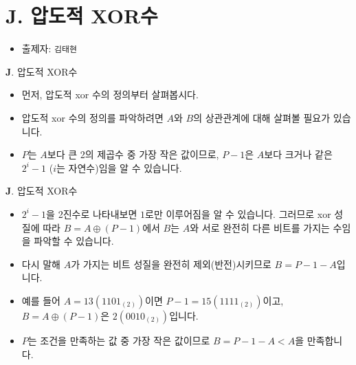 \section{J. 압도적 XOR수}

\begin{frame} %
    \begin{itemize}
        \item 출제자: \texttt{김태현}
    \end{itemize}
\end{frame}

\begin{frame}{\textbf{J}. 압도적 XOR수}
    \begin{itemize}
        \item 먼저, 압도적 xor 수의 정의부터 살펴봅시다.
        \item 압도적 xor 수의 정의를 파악하려면 $A$와 $B$의 상관관계에 대해 살펴볼 필요가 있습니다.
        \item $P$는 $A$보다 큰 2의 제곱수 중 가장 작은 값이므로, $P-1$은 $A$보다 크거나 같은 $2^i-1$ ($i$는 자연수)임을 알 수 있습니다.
    \end{itemize}
\end{frame}

\begin{frame}{\textbf{J}. 압도적 XOR수}
	\begin{itemize}
		\item $2^i-1$을 2진수로 나타내보면 $1$로만 이루어짐을 알 수 있습니다. 그러므로 xor 성질에 따라 $B = A \oplus (P-1)$에서 $B$는 $A$와 서로 완전히 다른 비트를 가지는 수임을 파악할 수 있습니다. 
		\item 다시 말해 $A$가 가지는 비트 성질을 완전히 제외(반전)시키므로 $B = P - 1 - A$입니다.
		\item 예를 들어 $A = 13 (1101_{(2)})$이면 $P-1 = 15 (1111_{(2)})$이고, $B = A \oplus (P-1)$은 $2 (0010_{(2)})$입니다. 
		\item $P$는 조건을 만족하는 값 중 가장 작은 값이므로 $B = P - 1 - A < A$을 만족합니다.
	\end{itemize}
\end{frame}


